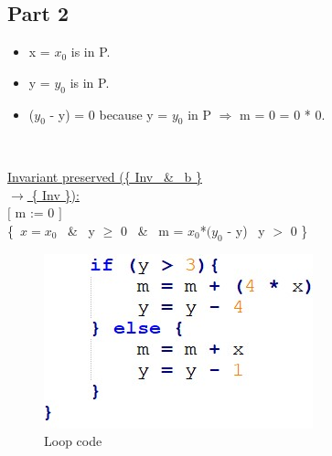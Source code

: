 \documentclass[a4paper,12pt]{article}
\begin{document}
\newpage
\subsection{Part 2}

\newline

\begin{itemize}[label = {\checkmark}]
    \item x = $x_{0}$ is in P.
    \item y = $y_{0}$ is in P.
    \item ($y_{0}$ - y) = 0 because y = $y_{0}$ in P $\Rightarrow$ m = 0 = 0 * 0.
\end{itemize} \\

\newpage

\underline{Invariant preserved (\{ Inv \ \& \ b \} \[ \] $\rightarrow$ \{ Inv \}):} \\

$[$ m := 0 $]$ \\
\{\ $x = x_{0}$ \ \& \ y $\geq$ 0 \ \& \ m = $x_{0}$*$(y_{0}$ - y) \ y $>$ 0 \}\ \\

\begin{figure}[H]
    \centering
	\includegraphics[scale = 1.0]{images/loop code.jpg}
	\caption{Loop code}
	\label{fig:loopCode}
\end{figure}
\end{document}

